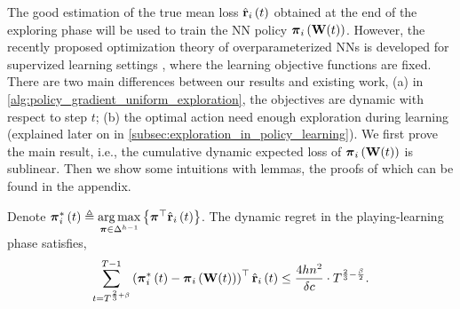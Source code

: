 The good estimation of the true mean loss $\hat{{\mathbf{r}}}_i\left(t\right)$ obtained at the end of the exploring phase will be used to train the NN policy ${\boldsymbol{\pi}}_i\left( {\mathbf{W}}(t) \right)$. However, the recently proposed optimization theory of overparameterized NNs is developed for supervized learning settings \citep{li2018learning,allen2018convergenceB}, where the learning objective functions are fixed. There are two main differences between our results and existing work, (a) in \cref{alg:policy_gradient_uniform_exploration}, the objectives are dynamic with respect to step $t$; (b) the optimal action need enough exploration during learning (explained later on in \cref{subsec:exploration_in_policy_learning}). We first prove the main result, i.e., the cumulative dynamic expected loss of ${\boldsymbol{\pi}}_i\left( {\mathbf{W}}(t) \right)$ is sublinear. Then we show some intuitions with lemmas, the proofs of which can be found in the appendix.
\begin{thm}
\label{thm:dynamic_regret_sublinear}
    Denote ${\boldsymbol{\pi}}_i^*\left(t\right) \triangleq \operatorname*{arg\,max}\limits_{{\boldsymbol{\pi}} \in \Delta^{h-1}}{\left\{ {\boldsymbol{\pi}}^\top \hat{{\mathbf{r}}}_i\left(t\right)\right\}}$. The dynamic regret in the playing-learning phase satisfies,
\begin{equation*}
\begin{split}
    \sum\limits_{t=T^{\frac{2}{3}+ \beta}}^{T-1}{ \left(  {{\boldsymbol{\pi}}_i^*\left(t\right)} - {\boldsymbol{\pi}}_i\left( {\mathbf{W}}(t) \right) \right)^\top \hat{{\mathbf{r}}}_i\left(t\right) } \le \frac{4 h n^2}{\delta c} \cdot T^{\frac{2}{3} - \frac{\beta}{2}}.
\end{split}
\end{equation*}
\end{thm}
